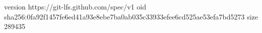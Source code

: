 version https://git-lfs.github.com/spec/v1
oid sha256:0fa92f1457fe6ed41a93e8ebe7ba0ab035c33933efee6cd525ae53efa7bd5273
size 289435
